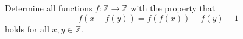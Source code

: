 Determine all functions $f:\mathbb{Z}\rightarrow\mathbb{Z}$ with the property that 
\[f(x-f(y))=f(f(x))-f(y)-1\]
holds for all $x,y\in\mathbb{Z}$.
